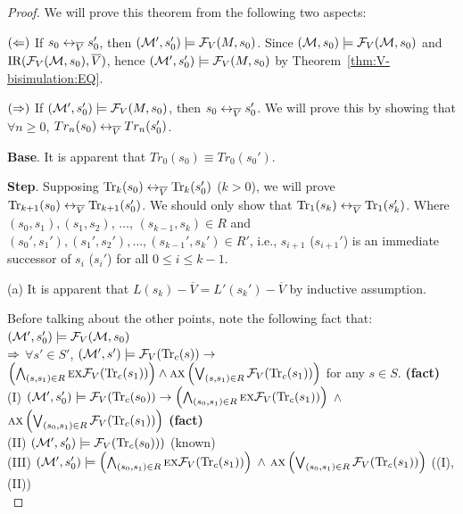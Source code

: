 \documentclass[letterpaper]{article} %
\begin{document}
\begin{proof}
We will prove this theorem from the following two aspects:

$(\Leftarrow)$ If $s_0 \leftrightarrow_{\overline V} s_0'$, then $({\cal M}',s_0') \models {\cal F}_V(M,s_0)$. Since $({\cal M}, s_0) \models {\cal F}_V({\cal M}, s_0)$ and $\textrm{IR}({\cal F}_V({\cal M}, s_0), \overline V)$, hence
$({\cal M}',s_0') \models {\cal F}_V(M,s_0)$ by Theorem~\ref{thm:V-bisimulation:EQ}.

$(\Rightarrow)$ If $({\cal M}',s_0') \models {\cal F}_V(M,s_0)$, then $s_0 \leftrightarrow_{\overline V} s_0'$. We will prove this by showing that $\forall n \geq 0$, $Tr_n(s_0) \leftrightarrow_{\overline V} Tr_n(s_0')$.


\textbf{Base}. It is apparent that $Tr_0(s_0) \equiv Tr_0(s_0')$.

\textbf{Step}. Supposing $\textrm{Tr}_k(s_0) \leftrightarrow_{\overline V} \textrm{Tr}_k(s_0')$ ($k > 0$), we will prove $\textrm{Tr}_{k+1}(s_0) \leftrightarrow_{\overline V} \textrm{Tr}_{k+1}(s_0')$. We should only show that $\textrm{Tr}_1(s_k) \leftrightarrow_{\overline V} \textrm{Tr}_1(s_k')$. Where $(s_0, s_1), (s_1, s_2)$, $\dots$, $(s_{k-1}, s_k) \in R$ and $(s_0', s_1'), (s_1', s_2'), \dots, (s_{k-1}', s_k') \in R'$, i.e., $s_{i+1}$ ($s_{i+1}'$) is an immediate successor of $s_i$ ($s_i'$) for all $0 \leq i \leq k-1$.

      (a) It is apparent that $L(s_k) - \overline V = L'(s_k') - \overline V$ by inductive assumption.

      Before talking about the other points, note the following fact that:\\
      $({\cal M}',s_0') \models {\cal F}_V({\cal M},s_0)$\\
      $\Rightarrow$ $\forall s'\in S'$, $({\cal M}', s')\models {\cal F}_V(\textrm{Tr}_c(s)) \rightarrow$ \\ $\left(\bigwedge_{(s,s_1)\in R} \textsc{e} \textsc{x} {\cal F}_V(\textrm{Tr}_c(s_1))\right)\wedge \textsc{a} \textsc{x} \left( \bigvee_{(s,s_1)\in R} {\cal F}_V(\textrm{Tr}_c(s_1))\right)$  for any $s\in S$.   \hfill  \textbf{(fact)}\\
      (I) $({\cal M}', s_0') \models {\cal F}_V(\textrm{Tr}_c(s_0)) \rightarrow \left(\bigwedge_{(s_0, s_1) \in R} \textsc{e} \textsc{x} {\cal F}_V(\textrm{Tr}_c(s_1))\right)$ $\wedge$ $\textsc{a} \textsc{x} \left(\bigvee_{(s_0, s_1) \in R} {\cal F}_V(\textrm{Tr}_c(s_1)) \right)$     \hfill  \textbf{(fact)}\\
        (II) $({\cal M}', s_0') \models {\cal F}_V(\textrm{Tr}_c(s_0)))$  \hfill  (known)\\
        (III) $({\cal M}', s_0') \models \left(\bigwedge_{(s_0, s_1) \in R} \textsc{e} \textsc{x} {\cal F}_V(\textrm{Tr}_c(s_1))\right)$ $\wedge$ $\textsc{a} \textsc{x} \left(\bigvee_{(s_0, s_1) \in R} {\cal F}_V(\textrm{Tr}_c(s_1)) \right)$  \hfill  ((I),(II))\\


\end{proof}
\end{document}

